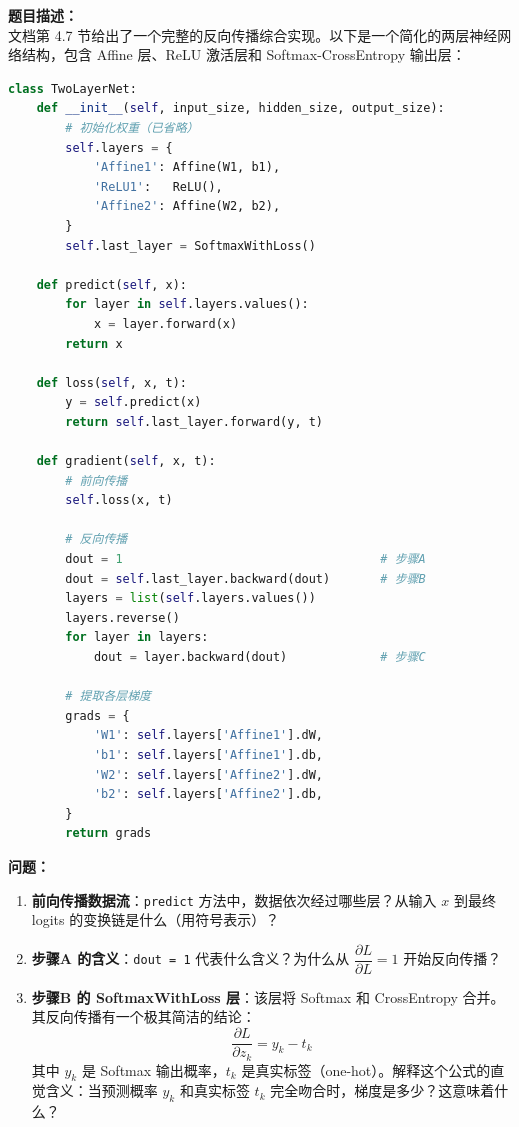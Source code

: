 \documentclass[a4paper,11pt]{ctexart}
\begin{document}
\begin{problembox}
    \textbf{题目描述：}\\
    文档第 4.7 节给出了一个完整的反向传播综合实现。以下是一个简化的两层神经网络结构，包含 Affine 层、ReLU 激活层和 Softmax-CrossEntropy 输出层：

    \begin{lstlisting}[language=Python]
class TwoLayerNet:
    def __init__(self, input_size, hidden_size, output_size):
        # 初始化权重（已省略）
        self.layers = {
            'Affine1': Affine(W1, b1),
            'ReLU1':   ReLU(),
            'Affine2': Affine(W2, b2),
        }
        self.last_layer = SoftmaxWithLoss()

    def predict(self, x):
        for layer in self.layers.values():
            x = layer.forward(x)
        return x

    def loss(self, x, t):
        y = self.predict(x)
        return self.last_layer.forward(y, t)

    def gradient(self, x, t):
        # 前向传播
        self.loss(x, t)

        # 反向传播
        dout = 1                                    # 步骤A
        dout = self.last_layer.backward(dout)       # 步骤B
        layers = list(self.layers.values())
        layers.reverse()
        for layer in layers:
            dout = layer.backward(dout)             # 步骤C

        # 提取各层梯度
        grads = {
            'W1': self.layers['Affine1'].dW,
            'b1': self.layers['Affine1'].db,
            'W2': self.layers['Affine2'].dW,
            'b2': self.layers['Affine2'].db,
        }
        return grads
    \end{lstlisting}

    \textbf{问题：}
    \begin{enumerate}[(1)]
        \item \textbf{前向传播数据流}：\texttt{predict} 方法中，数据依次经过哪些层？从输入 $x$ 到最终 logits 的变换链是什么（用符号表示）？

        \item \textbf{步骤A 的含义}：\texttt{dout = 1} 代表什么含义？为什么从 $\dfrac{\partial L}{\partial L} = 1$ 开始反向传播？

        \item \textbf{步骤B 的 SoftmaxWithLoss 层}：该层将 Softmax 和 CrossEntropy 合并。其反向传播有一个极其简洁的结论：
        \[
        \frac{\partial L}{\partial z_k} = y_k - t_k
        \]
        其中 $y_k$ 是 Softmax 输出概率，$t_k$ 是真实标签（one-hot）。解释这个公式的直觉含义：当预测概率 $y_k$ 和真实标签 $t_k$ 完全吻合时，梯度是多少？这意味着什么？


\end{enumerate}
\end{problembox}
\end{document}
